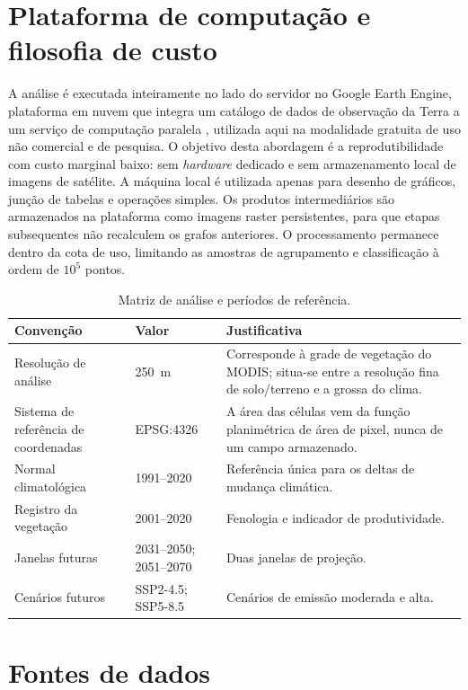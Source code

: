 \section{Plataforma de computação e filosofia de custo}\label{sec:cost}

A análise é executada inteiramente no lado do servidor no Google Earth Engine, plataforma em nuvem que
integra um catálogo de dados de observação da Terra a um serviço de computação paralela
\citep[pp.~18--19]{gorelick_google_2017}, utilizada aqui na modalidade gratuita de uso não comercial e
de pesquisa.
O objetivo desta abordagem é a reprodutibilidade com custo marginal baixo: sem \emph{hardware}
dedicado e sem armazenamento local de imagens de satélite. A máquina local é utilizada apenas para
desenho de gráficos, junção de tabelas e operações simples. Os produtos intermediários são
armazenados na plataforma como imagens raster persistentes, para que etapas subsequentes não
recalculem os grafos anteriores. O processamento permanece dentro da cota de uso, limitando as
amostras de agrupamento e classificação à ordem de $10^5$ pontos.

\begin{table}[H]
\centering
\caption{Matriz de análise e períodos de referência.}\label{tab:grid-periods}
\begin{tabular}{@{}p{3.2cm}p{3.8cm}p{6.3cm}@{}}
\toprule
Convenção & Valor & Justificativa \\
\midrule
Resolução de análise & 250~m & Corresponde à grade de vegetação do MODIS; situa-se entre a resolução fina de solo/terreno e a grossa do clima. \\
Sistema de referência de coordenadas & EPSG:4326 & A área das células vem da função planimétrica de área de pixel, nunca de um campo armazenado. \\
Normal climatológica & 1991--2020 & Referência única para os deltas de mudança climática. \\
Registro da vegetação & 2001--2020 & Fenologia e indicador de produtividade. \\
Janelas futuras & 2031--2050; 2051--2070 & Duas janelas de projeção. \\
Cenários futuros & SSP2-4.5; SSP5-8.5 & Cenários de emissão moderada e alta. \\
\bottomrule
\end{tabular}
\end{table}

\section{Fontes de dados}

